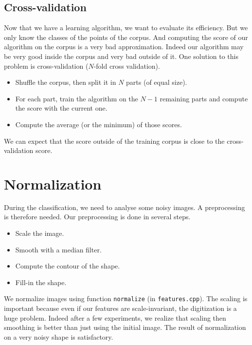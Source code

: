 \documentclass[a4paper, 11pt]{article}
\begin{document}
\subsection{Cross-validation}

Now that we have a learning algorithm, we want to evaluate its efficiency. But we only know the classes of the points of the corpus. And computing the score of our algorithm on the corpus is a very bad approximation. Indeed our algorithm may be very good inside the corpus and very bad outside of it. One solution to this problem is cross-validation ($N$-fold cross validation).
\begin{itemize}
	\item Shuffle the corpus, then split it in $N$ parts (of equal size).
	\item For each part, train the algorithm on the $N-1$ remaining parts and compute the score with the current one.
	\item Compute the average (or the minimum) of those scores.
\end{itemize}
We can expect that the score outside of the training corpus is close to the cross-validation score.


\newpage
\section{Normalization}

During the classification, we need to analyse some noisy images. A preprocessing is therefore needed. Our preprocessing is done in several steps.
\begin{itemize}
  \item Scale the image.
  \item Smooth with a median filter.
	\item Compute the contour of the shape.
	\item Fill-in the shape.
\end{itemize}

\noindent We normalize images using function \verb|normalize| (in \verb|features.cpp|).
The scaling is important because even if our features are scale-invariant, the digitization is a huge problem. Indeed after a few experiments, we realize that scaling then smoothing is better than just using the initial image. The result of normalization on a very noisy shape is satisfactory. 
\end{document}
